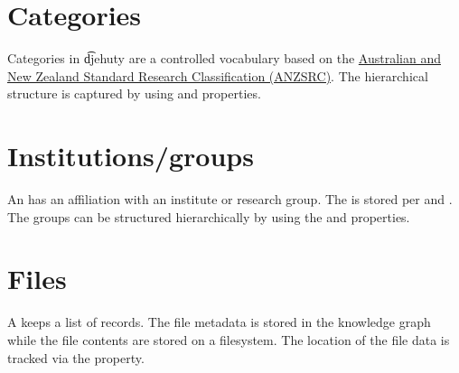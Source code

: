 \section{Categories}

  Categories in \t{djehuty} are a controlled vocabulary based on the
  \href{https://www.abs.gov.au/Ausstats/abs@.nsf/Latestproducts/4AE1B46AE2048A28CA25741800044242}%
  {Australian and New Zealand Standard Research Classification (ANZSRC)}.  The
  hierarchical structure is captured by using  and 
  properties.


\section{Institutions/groups}

  An  has an affiliation with an institute or research group.
  The  is stored per  and
  .  The groups can be structured hierarchically by
  using the  and  properties.


\section{Files}

  A  keeps a list of  records.  The file
  metadata is stored in the knowledge graph while the file contents are
  stored on a filesystem.  The location of the file data is tracked via the
   property.



